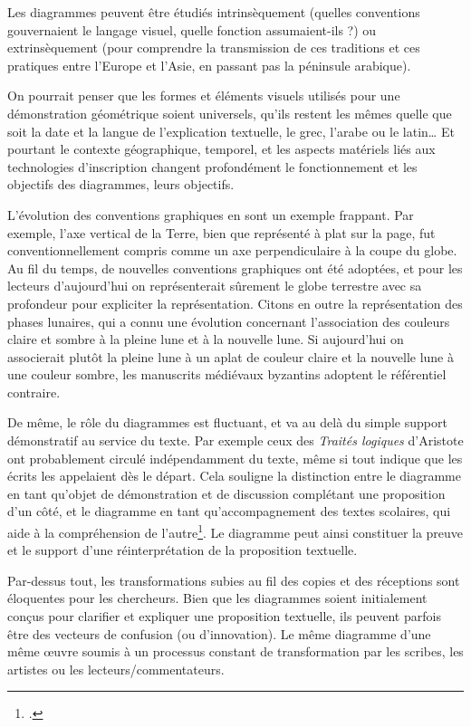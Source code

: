 Les diagrammes peuvent être étudiés intrinsèquement (quelles conventions
gouvernaient le langage visuel, quelle fonction assumaient-ils ?) ou
extrinsèquement (pour comprendre la transmission de ces traditions et
ces pratiques entre l'Europe et l'Asie, en passant pas la péninsule
arabique).

On pourrait penser que les formes et éléments visuels
utilisés pour une démonstration géométrique soient universels, qu'ils
restent les mêmes quelle que soit la date et la langue de l'explication
textuelle, le grec, l'arabe ou le latin\ldots{} Et pourtant le contexte
géographique, temporel, et les aspects matériels liés aux technologies
d'inscription changent profondément le fonctionnement et les objectifs des diagrammes,
leurs objectifs.

L'évolution des conventions graphiques en sont un exemple frappant. Par
exemple, l'axe vertical de la Terre, bien que représenté à plat sur la
page, fut conventionnellement compris comme un axe perpendiculaire à la
coupe du globe. Au fil du temps, de nouvelles conventions graphiques ont
été adoptées, et pour les lecteurs d'aujourd'hui on représenterait
sûrement le globe terrestre avec sa profondeur pour expliciter la
représentation. Citons en outre la représentation des phases lunaires,
qui a connu une évolution concernant l'association des couleurs claire
et sombre à la pleine lune et à la nouvelle lune. Si aujourd'hui on
associerait plutôt la pleine lune à un aplat de couleur claire et la
nouvelle lune à une couleur sombre, les manuscrits médiévaux byzantins
adoptent le référentiel contraire.

De même, le rôle du diagrammes est fluctuant, et va au delà du simple
support démonstratif au service du texte. Par exemple ceux des
\emph{Traités logiques} d'Aristote ont probablement circulé
indépendamment du texte, même si tout indique que les écrits les
appelaient dès le départ. Cela souligne la distinction entre le
diagramme en tant qu'objet de démonstration et de discussion complétant
une proposition d'un côté, et le diagramme en tant qu'accompagnement des
textes scolaires, qui aide à la compréhension de l'autre\footcite[p.5]{safran_diagram_2022}. Le
diagramme peut ainsi constituer la preuve et le support d'une
réinterprétation de la proposition textuelle.

Par-dessus tout, les transformations subies au fil des copies et des
réceptions sont éloquentes pour les chercheurs. Bien que les diagrammes
soient initialement conçus pour clarifier et expliquer une proposition textuelle, ils peuvent
parfois être des vecteurs de confusion (ou d'innovation). Le même diagramme d'une même
œuvre soumis à un processus constant de transformation par les scribes,
les artistes ou les lecteurs/commentateurs. 

